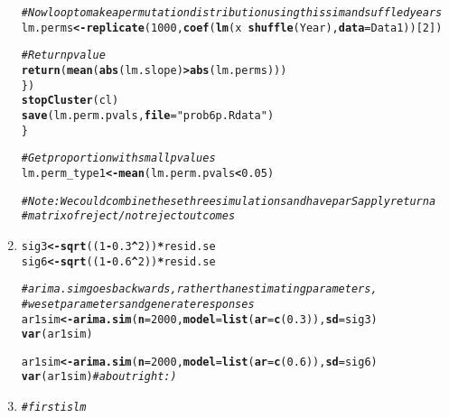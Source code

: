 \documentclass[11pt]{article}\usepackage[]{graphicx}\usepackage[]{color}
\makeatletter
\newcommand{\hlnum}[1]{\textcolor[rgb]{0,0,0}{#1}}%
\newcommand{\hlstr}[1]{\textcolor[rgb]{0,0,0}{#1}}%
\newcommand{\hlcom}[1]{\textcolor[rgb]{0.4,0.4,0.4}{\textit{#1}}}%
\newcommand{\hlopt}[1]{\textcolor[rgb]{0,0,0}{\textbf{#1}}}%
\newcommand{\hlstd}[1]{\textcolor[rgb]{0,0,0}{#1}}%
\newcommand{\hlkwb}[1]{\textcolor[rgb]{0,0,0}{\textbf{#1}}}%
\newcommand{\hlkwc}[1]{\textcolor[rgb]{0,0,0}{\textbf{#1}}}%
\newcommand{\hlkwd}[1]{\textcolor[rgb]{0,0,0}{\textbf{#1}}}%
\newenvironment{kframe}{%
 \def\at@end@of@kframe{}%
 \ifinner\ifhmode%
  \def\at@end@of@kframe{\end{minipage}}%
  \begin{minipage}{\columnwidth}%
 \fi\fi%
 \def\FrameCommand##1{\hskip\@totalleftmargin \hskip-\fboxsep
 \colorbox{shadecolor}{##1}\hskip-\fboxsep
     \hskip-\linewidth \hskip-\@totalleftmargin \hskip\columnwidth}%
 \MakeFramed {\advance\hsize-\width
   \@totalleftmargin\z@ \linewidth\hsize
   \@setminipage}}%
 {\par\unskip\endMakeFramed%
 \at@end@of@kframe}
\newenvironment{knitrout}{}{} %
\makeatother
\begin{document}
\begin{enumerate}
\begin{knitrout}
\begin{kframe}
\begin{alltt}
    \hlcom{# Now loop to make a permutation distribution using this sim and suffled years}
    \hlstd{lm.perms} \hlkwb{<-} \hlkwd{replicate}\hlstd{(}\hlnum{1000}\hlstd{,} \hlkwd{coef}\hlstd{(}\hlkwd{lm}\hlstd{(x} \hlopt{~} \hlkwd{shuffle}\hlstd{(Year),} \hlkwc{data} \hlstd{= Data1))[}\hlnum{2}\hlstd{])}

    \hlcom{# Return pvalue}
    \hlkwd{return}\hlstd{(}\hlkwd{mean}\hlstd{(}\hlkwd{abs}\hlstd{(lm.slope)} \hlopt{>} \hlkwd{abs}\hlstd{(lm.perms)))}
  \hlstd{\})}
  \hlkwd{stopCluster}\hlstd{(cl)}
  \hlkwd{save}\hlstd{(lm.perm.pvals,} \hlkwc{file} \hlstd{=} \hlstr{"prob6p.Rdata"}\hlstd{)}
\hlstd{\}}

\hlcom{# Get proportion with small pvalues}
\hlstd{lm.perm_type1} \hlkwb{<-} \hlkwd{mean}\hlstd{(lm.perm.pvals} \hlopt{<} \hlnum{0.05}\hlstd{)}


\hlcom{# Note: We could combine these three simulations and have parSapply return a}
\hlcom{# matrix of reject/not reject outcomes}
\end{alltt}
\end{kframe}
\end{knitrout}
\item%
\begin{knitrout}\footnotesize
{}\color{fgcolor}\begin{kframe}
\begin{alltt}
\hlstd{sig3} \hlkwb{<-} \hlkwd{sqrt}\hlstd{((}\hlnum{1}\hlopt{-}\hlnum{0.3}\hlopt{^}\hlnum{2}\hlstd{))} \hlopt{*} \hlstd{resid.se}
\hlstd{sig6} \hlkwb{<-} \hlkwd{sqrt}\hlstd{((}\hlnum{1}\hlopt{-}\hlnum{0.6}\hlopt{^}\hlnum{2}\hlstd{))} \hlopt{*} \hlstd{resid.se}

\hlcom{#arima.sim goes backwards, rather than estimating parameters, }
\hlcom{#we set parameters and generate responses}
\hlstd{ar1sim}\hlkwb{<-}\hlkwd{arima.sim}\hlstd{(}\hlkwc{n}\hlstd{=}\hlnum{2000}\hlstd{,}\hlkwc{model}\hlstd{=}\hlkwd{list}\hlstd{(}\hlkwc{ar}\hlstd{=}\hlkwd{c}\hlstd{(}\hlnum{0.3}\hlstd{)),}\hlkwc{sd}\hlstd{=sig3)}
\hlkwd{var}\hlstd{(ar1sim)}

\hlstd{ar1sim}\hlkwb{<-}\hlkwd{arima.sim}\hlstd{(}\hlkwc{n}\hlstd{=}\hlnum{2000}\hlstd{,}\hlkwc{model}\hlstd{=}\hlkwd{list}\hlstd{(}\hlkwc{ar}\hlstd{=}\hlkwd{c}\hlstd{(}\hlnum{0.6}\hlstd{)),}\hlkwc{sd}\hlstd{=sig6)}
\hlkwd{var}\hlstd{(ar1sim)} \hlcom{# about right :)}
\end{alltt}
\end{kframe}
\end{knitrout}
\item%
\begin{knitrout}\footnotesize
{}\color{fgcolor}\begin{kframe}
\begin{alltt}
\hlcom{# first is lm}


\end{alltt}
\end{kframe}
\end{knitrout}
\end{enumerate}
\end{document}
